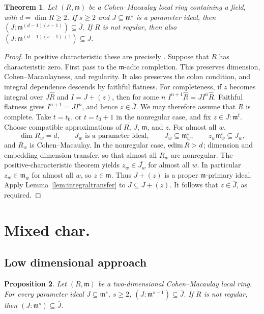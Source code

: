 \documentclass[11pt,a4paper]{amsart}
\numberwithin{equation}{section}
\newtheorem{theorem}{Theorem}[section]
\newtheorem{proposition}[theorem]{Proposition}
\newcommand{\m}{\mathfrak m}
\newcommand{\ol}[1]{\overline{#1}}
\begin{document}
 \begin{theorem}\label{thm:field}
 	Let $(R,\m)$ be a Cohen--Macaulay local ring containing a field,
 	with $d=\dim R\geq2$.  If $s\geq2$ and $J\subseteq\m^s$ is a
 	parameter ideal, then
 	$ (J:\m^{(d-1)(s-1)})\subseteq\ol J. $
 	If $R$ is not regular, then also
 	$ (J:\m^{(d-1)(s-1)+1})\subseteq\ol J. $
 \end{theorem}
 \begin{proof}
 	In positive characteristic these are precisely \cite[Theorem \ref{thm:WY}]{WY}.
 	Suppose that $R$ has characteristic zero.
  	First pass to the $\m$-adic completion.  This preserves dimension,
 	Cohen--Macaulayness, and regularity.  It also preserves the
 	colon condition, and integral dependence descends by faithful
 	flatness.  For completeness, if $z$ becomes integral over
 	$J\widehat R$ and $I=J+(z)$, then for some $n$
 	$ 	I^{n+1}\widehat R=JI^n\widehat R. $
 	Faithful flatness gives $I^{n+1}=JI^n$, and hence $z\in\ol J$.
 	We may therefore assume that $R$ is complete.
 	Take $t=t_0$, or $t=t_0+1$ in the nonregular case, and fix
 	$z\in J:\m^t$.  Choose compatible approximations of $R$, $J$,
 	$\m$, and $z$.  For almost all $w$,
 	$$	\dim R_w=d,\qquad
 	J_w\text{ is a parameter ideal},\qquad
 	J_w\subseteq\m_w^s,\qquad
 	z_w\m_w^t\subseteq J_w,	$$
 	and $R_w$ is Cohen--Macaulay.
 	In the nonregular case, $\operatorname{edim} R>d$; dimension and embedding
 	dimension transfer, so that almost all $R_w$ are nonregular.
 	The positive-characteristic theorem yields
 	$z_w\in\ol{J_w}$ for almost all $w$.
 	In particular $z_w\in\m_w$ for almost all $w$, so $z\in\m$.
 	Thus $J+(z)$ is a proper $\m$-primary ideal.
 	Apply Lemma~\ref{lem:integraltransfer} to $J\subseteq J+(z)$.
 	It follows that $z\in\ol J$, as required.
 \end{proof}
 

 
 
 
 \section{Mixed char. }
 
  \subsection{Low dimensional approach}
 \begin{proposition} \label{thm:dimtwo}
 	Let $(R,\m)$ be a two-dimensional Cohen--Macaulay local ring.
 	For every parameter ideal $J\subseteq\m^s$, $s\geq2$,
 	$(J:\m^{s-1})\subseteq\ol J.$
 	If $R$ is not regular, then
 	$ (J:\m^s)\subseteq\ol J. 	$
 \end{proposition}
 
\end{document}
